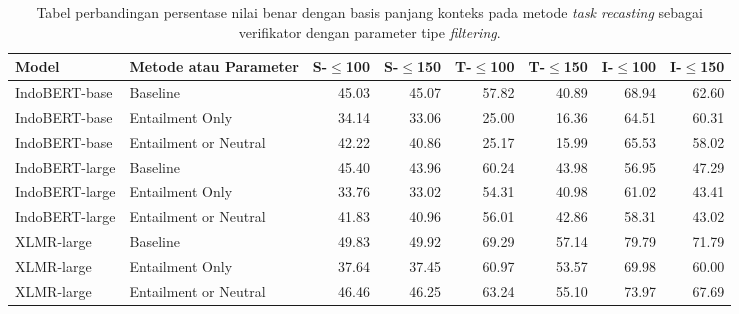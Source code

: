 \begin{table}[H]\centering
\footnotesize
\begin{tabular}{llrrrrrr}
\toprule
         Model &                Metode atau Parameter &  S-$\leq$100 &  S-$\leq$150 &  T-$\leq$100 &  T-$\leq$150 &  I-$\leq$100 &  I-$\leq$150 \\
\midrule
 IndoBERT-base &              Baseline &                  45.03 &                  45.07 &                  57.82 &                  40.89 &                  68.94 &                  62.60 \\
 IndoBERT-base &       Entailment Only &                  34.14 &                  33.06 &                  25.00 &                  16.36 &                  64.51 &                  60.31 \\
 IndoBERT-base & Entailment or Neutral &                  42.22 &                  40.86 &                  25.17 &                  15.99 &                  65.53 &                  58.02 \\
\hline
IndoBERT-large &              Baseline &                  45.40 &                  43.96 &                  60.24 &                  43.98 &                  56.95 &                  47.29 \\
IndoBERT-large &       Entailment Only &                  33.76 &                  33.02 &                  54.31 &                  40.98 &                  61.02 &                  43.41 \\
IndoBERT-large & Entailment or Neutral &                  41.83 &                  40.96 &                  56.01 &                  42.86 &                  58.31 &                  43.02 \\
\hline
    XLMR-large &              Baseline &                  49.83 &                  49.92 &                  69.29 &                  57.14 &                  79.79 &                  71.79 \\
    XLMR-large &       Entailment Only &                  37.64 &                  37.45 &                  60.97 &                  53.57 &                  69.98 &                  60.00 \\
    XLMR-large & Entailment or Neutral &                  46.46 &                  46.25 &                  63.24 &                  55.10 &                  73.97 &                  67.69 \\
\bottomrule
\end{tabular}
\caption{Tabel perbandingan persentase nilai benar dengan basis panjang konteks pada metode \emph{task recasting} sebagai verifikator dengan parameter tipe \emph{filtering}.}
\end{table}

